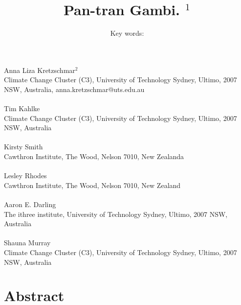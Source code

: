 \documentclass[12pt]{article}
\title{Pan-tran Gambi. $^{1}$}
\author{Key words: }
\date{}
\begin{document}
\maketitle
\paragraph{}Anna Liza Kretzschmar$^{2}$\\
Climate Change Cluster (C3), University of Technology Sydney, Ultimo, 2007 NSW, Australia, anna.kretzschmar@uts.edu.au
\paragraph{}Tim Kahlke\\
Climate Change Cluster (C3), University of Technology Sydney, Ultimo, 2007 NSW, Australia
\paragraph{}Kirsty Smith \\
Cawthron Institute, The Wood, Nelson 7010, New Zealanda
\paragraph{}Lesley Rhodes \\
Cawthron Institute, The Wood, Nelson 7010, New Zealand
\paragraph{}Aaron E. Darling \\
The ithree institute, University of Technology Sydney, Ultimo, 2007 NSW, Australia
\paragraph{}Shauna Murray\\ 
Climate Change Cluster (C3), University of Technology Sydney, Ultimo, 2007 NSW, Australia
\newpage
\section*{Abstract}
\end{document}
